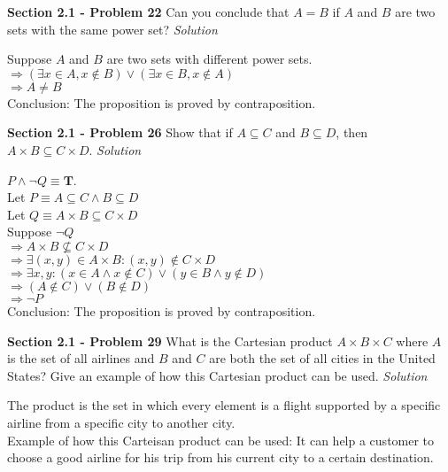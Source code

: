 \documentclass[10pt]{article}
\renewcommand{\lor}{\vee}
\renewcommand{\land}{\wedge}
\begin{document}
\clearpage
\textbf{Section 2.1 - Problem 22} Can you conclude that $A = B$ if $A$ and $B$ are two sets
with the same power set?
\bigbreak
\textit{Solution} 
\bigbreak

    Suppose $A$ and $B$ are two sets with different power sets. \\
    $\Rightarrow (\exists x \in A, x \not \in B) \lor (\exists x \in B, x \not \in A)$ \\
    $\Rightarrow A \neq B$ \\
    Conclusion: The proposition is proved by contraposition.

\clearpage
\textbf{Section 2.1 - Problem 26} Show that if $A \subseteq C$ and $B \subseteq D$, then
$A \times B \subseteq C \times D$.
\bigbreak
\textit{Solution} 
\bigbreak

    $P \land \lnot Q \equiv \mathbf{T}$. \\
    Let $P \equiv A \subseteq C \land B \subseteq D$ \\
    Let $Q \equiv A \times B \subseteq C \times D$ \\
    Suppose $\lnot Q$ \\
    $\Rightarrow A \times B \not \subseteq C \times D $ \\
    $\Rightarrow \exists (x, y) \in A \times B: (x, y) \not \in C \times D$ \\
    $\Rightarrow \exists x, y: (x \in A \land x \not \in C) \lor (y \in B \land y \not \in D)$ \\
    $\Rightarrow (A \not \in C) \lor (B \not \in D)$ \\
    $\Rightarrow \lnot P$ \\

    Conclusion: The proposition is proved by contraposition.

\clearpage
\textbf{Section 2.1 - Problem 29} What is the Cartesian product $A \times B \times C$ where $A$
is the set of all airlines and $B$ and $C$ are both the set of all cities in the United States?
Give an example of how this Cartesian product can be used.
\bigbreak
\textit{Solution} 
\bigbreak

    The product is the set in which every element is a flight supported by a specific airline
    from a specific city to another city. \\
    Example of how this Carteisan product can be used: It can help a customer to choose a good
    airline for his trip from his current city to a certain destination.
\end{document}
